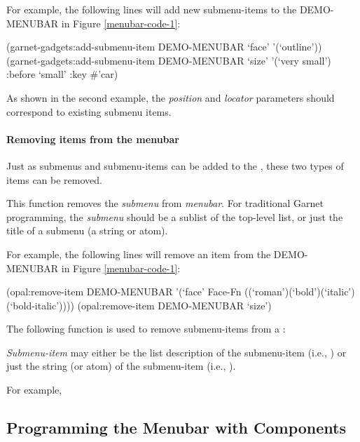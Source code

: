 For example, the following lines will add new submenu-items to the
DEMO-MENUBAR in Figure \ref{menubar-code-1}:
\begin{programexample}
(garnet-gadgets:add-submenu-item DEMO-MENUBAR `face' '(`outline'))
(garnet-gadgets:add-submenu-item DEMO-MENUBAR `size' '(`very small')
                                              :before `small' :key \#'car)
\end{programexample}
As shown in the second example, the {\it position} and {\it locator} parameters
should correspond to existing submenu items.


\paragraph{Removing items from the menubar}

Just as submenus and submenu-items can be added to the , these
two types of items can be removed.

This function removes the {\it submenu} from {\it menubar}.  For traditional
Garnet programming, the {\it submenu} should be a sublist of the top-level
 list, or just the title of a submenu (a string or atom).

For example, the following lines will remove an item from the DEMO-MENUBAR
in Figure \ref{menubar-code-1}:
\begin{programexample}
(opal:remove-item DEMO-MENUBAR
                  '(`face' Face-Fn ((`roman')(`bold')(`italic')(`bold-italic'))))
(opal:remove-item DEMO-MENUBAR `size')
\end{programexample}

The following function is used to remove submenu-items from a :

{\it Submenu-item} may either be the list description of the submenu-item
(i.e., ) or just the string (or atom) of the submenu-item
(i.e., ).

For example,


\subsection{Programming the Menubar with Components}

